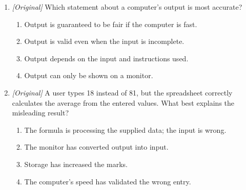 \begin{enumerate}[label=\textbf{Q\arabic*.}, leftmargin=*]
\begin{enumerate}[label=\Alph*.]
    \item Amounts -- output; formula -- input
    \item Amounts -- input; formula -- processing
    \item Amounts -- storage; formula -- output
    \item Amounts -- processing; formula -- storage
  \end{enumerate}
\item \textit{[Original]} Which statement about a computer's output is
  most accurate?
  \begin{enumerate}[label=\Alph*.]
    \item Output is guaranteed to be fair if the computer is fast.
    \item Output is valid even when the input is incomplete.
    \item Output depends on the input and instructions used.
    \item Output can only be shown on a monitor.
  \end{enumerate}
\item \textit{[Original]} A user types 18 instead of 81, but the spreadsheet
  correctly calculates the average from the entered values. What best
  explains the misleading result?
  \begin{enumerate}[label=\Alph*.]
    \item The formula is processing the supplied data; the input is wrong.
    \item The monitor has converted output into input.
    \item Storage has increased the marks.
    \item The computer's speed has validated the wrong entry.
  \end{enumerate}


\end{enumerate}
